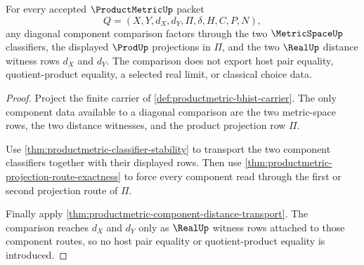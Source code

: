 \begin{theorem}
\label{thm:productmetric-component-diagonal-boundary}
For every accepted $\ProductMetricUp$ packet
$$
Q=(X,Y,d_X,d_Y,\Pi,\delta,H,C,P,N),
$$
any diagonal component comparison factors through the two $\MetricSpaceUp$ classifiers, the displayed $\ProdUp$ projections in $\Pi$, and the two $\RealUp$ distance witness rows $d_X$ and $d_Y$. The comparison does not export host pair equality, quotient-product equality, a selected real limit, or classical choice data.
\end{theorem}
\begin{proof}
Project the finite carrier of \autoref{def:productmetric-bhist-carrier}. The only component data available to a diagonal comparison are the two metric-space rows, the two distance witnesses, and the product projection row $\Pi$.

Use \autoref{thm:productmetric-classifier-stability} to transport the two component classifiers together with their displayed rows. Then use \autoref{thm:productmetric-projection-route-exactness} to force every component read through the first or second projection route of $\Pi$.

Finally apply \autoref{thm:productmetric-component-distance-transport}. The comparison reaches $d_X$ and $d_Y$ only as $\RealUp$ witness rows attached to those component routes, so no host pair equality or quotient-product equality is introduced.
\end{proof}

